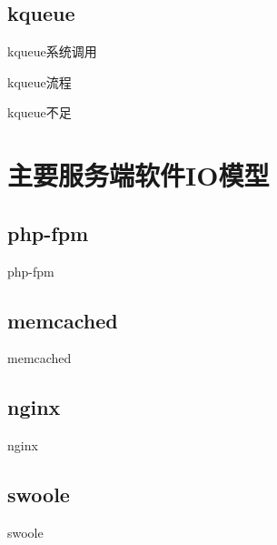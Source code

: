 \documentclass[UTF8]{beamer}
\begin{document}
\subsection{kqueue}
\begin{frame}[fragile]{kqueue系统调用}
  \begin{ccode}
  \end{ccode}
\end{frame}
\begin{frame}[fragile]{kqueue流程}
  \begin{ccode}
  \end{ccode}
\end{frame}
\begin{frame}[fragile]{kqueue不足}
  \begin{ccode}
  \end{ccode}
\end{frame}
\section{主要服务端软件IO模型}
\subsection{php-fpm}
\begin{frame}[fragile]{php-fpm}
  \begin{ccode}
  \end{ccode}
\end{frame}
\subsection{memcached}
\begin{frame}[fragile]{memcached}
  \begin{ccode}
  \end{ccode}
\end{frame}
\subsection{nginx}
\begin{frame}[fragile]{nginx}
  \begin{ccode}
  \end{ccode}
\end{frame}
\subsection{swoole}
\begin{frame}[fragile]{swoole}
  \begin{ccode}
  \end{ccode}
\end{frame}
\end{document}
